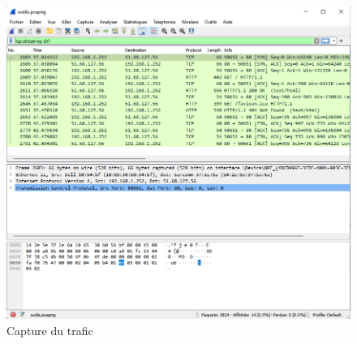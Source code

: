 \begin{figure}[tbp]
\centerline{\includegraphics[width=1\columnwidth]{Pictures/ws-capture.png}}
\caption{Capture du trafic}
\label{fig-wires-cap}
\end{figure}

